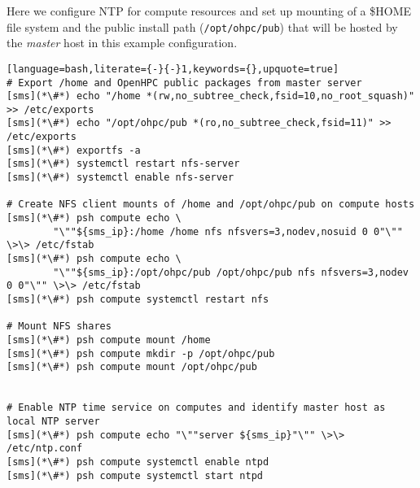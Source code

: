 Here we configure NTP for compute resources and set up \NFS{}  mounting of a
\$HOME file system and the public \OHPC{} install path (\texttt{/opt/ohpc/pub})
that will be hosted by the {\em master} host in this  example configuration.

\vspace*{0.15cm}
\begin{lstlisting}[language=bash,literate={-}{-}1,keywords={},upquote=true]
# Export /home and OpenHPC public packages from master server
[sms](*\#*) echo "/home *(rw,no_subtree_check,fsid=10,no_root_squash)" >> /etc/exports
[sms](*\#*) echo "/opt/ohpc/pub *(ro,no_subtree_check,fsid=11)" >> /etc/exports
[sms](*\#*) exportfs -a
[sms](*\#*) systemctl restart nfs-server
[sms](*\#*) systemctl enable nfs-server

# Create NFS client mounts of /home and /opt/ohpc/pub on compute hosts
[sms](*\#*) psh compute echo \
        "\""${sms_ip}:/home /home nfs nfsvers=3,nodev,nosuid 0 0"\"" \>\> /etc/fstab
[sms](*\#*) psh compute echo \
        "\""${sms_ip}:/opt/ohpc/pub /opt/ohpc/pub nfs nfsvers=3,nodev 0 0"\"" \>\> /etc/fstab
[sms](*\#*) psh compute systemctl restart nfs

# Mount NFS shares
[sms](*\#*) psh compute mount /home
[sms](*\#*) psh compute mkdir -p /opt/ohpc/pub
[sms](*\#*) psh compute mount /opt/ohpc/pub


# Enable NTP time service on computes and identify master host as local NTP server
[sms](*\#*) psh compute echo "\""server ${sms_ip}"\"" \>\> /etc/ntp.conf
[sms](*\#*) psh compute systemctl enable ntpd
[sms](*\#*) psh compute systemctl start ntpd

\end{lstlisting}

